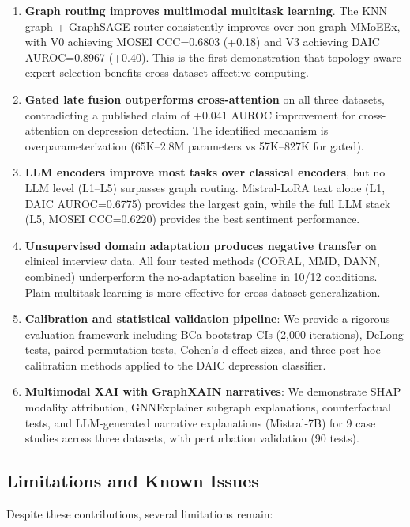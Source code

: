 \documentclass[12pt,oneside]{book}
\begin{document}
\begin{itemize}
\begin{enumerate}
    \item \textbf{Graph routing improves multimodal multitask learning}. The KNN graph + GraphSAGE router consistently improves over non-graph MMoEEx, with V0 achieving MOSEI CCC=0.6803 (+0.18) and V3 achieving DAIC AUROC=0.8967 (+0.40). This is the first demonstration that topology-aware expert selection benefits cross-dataset affective computing.
    \item \textbf{Gated late fusion outperforms cross-attention} on all three datasets, contradicting a published claim of +0.041 AUROC improvement for cross-attention on depression detection. The identified mechanism is overparameterization (65K--2.8M parameters vs 57K--827K for gated).
    \item \textbf{LLM encoders improve most tasks over classical encoders}, but no LLM level (L1--L5) surpasses graph routing. Mistral-LoRA text alone (L1, DAIC AUROC=0.6775) provides the largest gain, while the full LLM stack (L5, MOSEI CCC=0.6220) provides the best sentiment performance.
    \item \textbf{Unsupervised domain adaptation produces negative transfer} on clinical interview data. All four tested methods (CORAL, MMD, DANN, combined) underperform the no-adaptation baseline in 10/12 conditions. Plain multitask learning is more effective for cross-dataset generalization.
    \item \textbf{Calibration and statistical validation pipeline}: We provide a rigorous evaluation framework including BCa bootstrap CIs (2,000 iterations), DeLong tests, paired permutation tests, Cohen's d effect sizes, and three post-hoc calibration methods applied to the DAIC depression classifier.
    \item \textbf{Multimodal XAI with GraphXAIN narratives}: We demonstrate SHAP modality attribution, GNNExplainer subgraph explanations, counterfactual tests, and LLM-generated narrative explanations (Mistral-7B) for 9 case studies across three datasets, with perturbation validation (90 tests).
\end{enumerate}

\subsection{Limitations and Known Issues}

Despite these contributions, several limitations remain:


\end{itemize}
\end{document}
